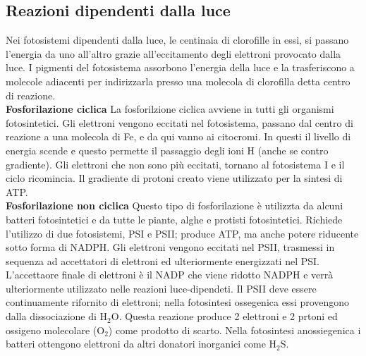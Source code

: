 \subsection{Reazioni dipendenti dalla luce}
Nei fotosistemi dipendenti dalla luce, le centinaia di clorofille in essi, si passano l'energia da uno all'altro grazie all'eccitamento degli elettroni provocato dalla luce. I pigmenti del fotosistema assorbono l'energia della luce e la trasferiscono a molecole adiacenti per indirizzarla presso una molecola di clorofilla detta centro di reazione. 
\\\textbf{Fosforilazione ciclica}
La fosforilzione ciclica avviene in tutti gli organismi fotosintetici. Gli elettroni vengono eccitati nel fotosistema, passano dal centro di reazione a una molecola di Fe, e da qui vanno ai citocromi. In questi il livello di energia scende e questo permette il passaggio degli ioni H\ap{+} (anche se contro gradiente). Gli elettroni che non sono pi\`u eccitati, tornano al fotosistema I e il ciclo ricomincia. Il gradiente di protoni creato viene utilizzato per la sintesi di ATP.
\\\textbf{Fosforilazione non ciclica}
Questo tipo di fosforilazione \`e utilizzta da alcuni  batteri fotosintetici e da tutte le piante, alghe e protisti fotosintetici. Richiede l'utilizzo di due fotosistemi, PSI e PSII; produce ATP, ma anche potere riducente sotto forma di NADPH. Gli elettroni vengono eccitati nel PSII, trasmessi in sequenza ad accettatori di elettroni ed ulteriormente energizzati nel PSI. L'accettaore finale di elettroni \`e il NADP\ap{+} che viene ridotto NADPH e verr\`a ulteriormente utilizzato nelle reazioni luce-dipendeti. Il PSII deve essere continuamente rifornito di elettroni; nella fotosintesi ossegenica essi provengono dalla dissociazione di H$_2$O. Questa reazione produce 2 elettroni e 2 prtoni ed ossigeno molecolare (O$_2$) come prodotto di scarto. Nella fotosintesi anossiegenica i batteri ottengono elettroni da altri donatori inorganici come H$_2$S.
